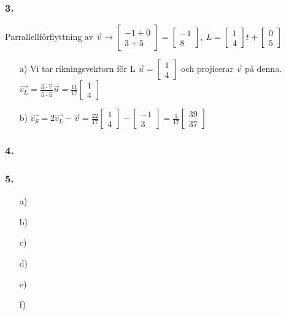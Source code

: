 \documentclass{article}
\begin{document}
\subsubsection*{3.}
Parrallellförflyttning av $\vec{v} \to \begin{bmatrix}-1+0 \\ 3+5\end{bmatrix}=\begin{bmatrix}-1 \\ 8\end{bmatrix},\ L=\begin{bmatrix}1 \\ 4\end{bmatrix}t+\begin{bmatrix}0 \\ 5\end{bmatrix}$
\begin{itemize}
\item[a) ] Vi tar rikningsvektorn för L $\vec{u}=\begin{bmatrix}1 \\ 4\end{bmatrix}$ och projicerar $\vec{v}$ på denna. $\vec{v_{L}}=\frac{\vec{u}\cdot\vec{v}}{\vec{u}\cdot\vec{u}}\vec{u}=\frac{11}{17}\begin{bmatrix}1 \\ 4 \end{bmatrix}$
\item[b) ] $\vec{v_{S}}=2\vec{v_{L}}-\vec{v}= \frac{22}{17}\begin{bmatrix}1 \\ 4 \end{bmatrix}- \begin{bmatrix}-1 \\ 3 \end{bmatrix} =\frac{1}{17} \begin{bmatrix} 39 \\ 37\end{bmatrix}$
\end{itemize}

\subsubsection*{4.}
  

\subsubsection*{5.}
\begin{itemize}
\item[a) ]  
\item[b) ] 
\item[c) ] 
\item[d) ] 
\item[e) ] 
\item[f) ] 
\end{itemize}
\end{document}
